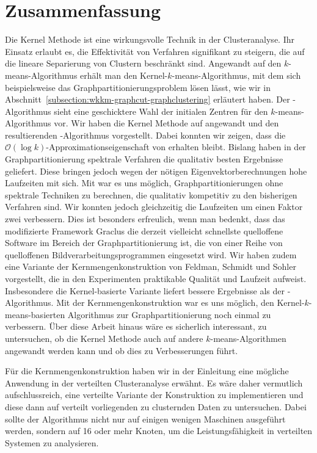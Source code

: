 \section{Zusammenfassung}
\label{section:conclusion}

Die Kernel Methode ist eine wirkungsvolle Technik in der Clusteranalyse. Ihr Einsatz erlaubt es, die Effektivität von Verfahren
signifikant zu steigern, die auf die lineare Separierung von Clustern beschränkt sind. Angewandt auf den $k$-means-Algorithmus
erhält man den Kernel-$k$-means-Algorithmus, mit dem sich beispielsweise das Graph\-partitionierungsproblem lösen lässt, wie wir
in Abschnitt~\ref{subsection:wkkm-graphcut-graphclustering} erläutert haben.
\absatz
Der \kmpp-Algorithmus sieht eine geschicktere Wahl der initialen Zentren für den $k$-means-Algorithmus vor.
Wir haben die Kernel Methode auf \kmpp{} angewandt und den resultierenden \kkmpp-Algorithmus vorgestellt.
Dabei konnten wir zeigen, dass die $\mathcal{O}(\log k)$-Approximationseigenschaft von \kmpp{} erhalten bleibt.
Bislang haben in der Graphpartitionierung spektrale Verfahren die qualitativ besten Ergebnisse geliefert.
Diese bringen jedoch wegen der nötigen Eigenvektorberechnungen hohe Laufzeiten mit sich.
Mit \kkmpp{} war es uns möglich, Graphpartitionierungen ohne spektrale Techniken zu berechnen, die qualitativ kompetitiv zu
den bisherigen Verfahren sind. Wir konnten jedoch gleichzeitig die Laufzeiten um einen Faktor zwei verbessern. Dies ist besonders
erfreulich, wenn man bedenkt, dass das modifizierte Framework Graclus die derzeit vielleicht schnellste quelloffene
Software im Bereich der Graphpartitionierung ist, die von einer Reihe von quelloffenen Bildverarbeitungsprogrammen eingesetzt wird.
\absatz
Wir haben zudem eine Variante der Kernmengenkonstruktion von Feldman, Schmidt und Sohler~\cite{FeldmanSS13} vorgestellt,
die in den Experimenten praktikable Qualität und Laufzeit aufweist. Insbesondere die Kernel-basierte Variante liefert bessere
Ergebnisse als der \kmpp-Algorithmus. Mit der Kernmengenkonstruktion war es uns möglich, den Kernel-$k$-means-basierten 
Algorithmus zur Graphpartitionierung noch einmal zu verbessern.
\absatz
Über diese Arbeit hinaus wäre es sicherlich interessant, zu untersuchen, ob die Kernel Methode auch auf andere $k$-means-Algorithmen
angewandt werden kann und ob dies zu Verbesserungen führt.

Für die Kernmengenkonstruktion haben wir in der Einleitung eine mögliche Anwendung in der verteilten Clusteranalyse erwähnt.
Es wäre daher vermutlich aufschlussreich, eine verteilte Variante der Konstruktion zu implementieren und diese dann auf verteilt
vorliegenden zu clusternden Daten zu untersuchen. Dabei sollte der Algorithmus nicht nur auf einigen wenigen Maschinen ausgeführt
werden, sondern auf 16 oder mehr Knoten, um die Leistungsfähigkeit in verteilten Systemen zu analysieren.